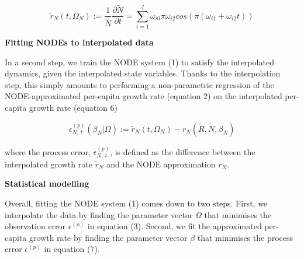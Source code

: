 \documentclass[11pt, oneside]{article}
\begin{document}
\vspace{-0.5cm}
\begin{equation}
    \tilde{r}_N (t,\Omega_N) := \frac{1}{\tilde{N}} \frac{\partial \tilde{N}}{\partial t} = \sum_{i=1}^{I} \omega_{i0} \pi \omega_{i2} cos \left(\pi (\omega_{i1} + \omega_{i2} t) \right)
\end{equation}


\textbf{Fitting NODEs to interpolated data}

In a second step, we train the NODE system (1) to satisfy the interpolated dynamics, given the interpolated state variables.
Thanks to the interpolation step, this simply amounts to performing a non-parametric regression of the NODE-approximated per-capita growth rate (equation 2) on the interpolated per-capita growth rate (equation 6)

\vspace{-0.5cm}
\begin{equation}
    \epsilon^{(p)}_{N,~t}(\beta_N | \Omega) := \tilde{r}_N (t,\Omega_N) - r_N \left( \tilde{R},\tilde{N},\beta_N \right)
\end{equation}

where the process error, $\epsilon^{(p)}_{N,~t}$, is defined as the difference between the interpolated growth rate $\tilde{r}_N$ and the NODE approximation $r_N$. 

\textbf{Statistical modelling}

Overall, fitting the NODE system (1) comes down to two steps. 
First, we interpolate the data by finding the parameter vector $\Omega$ that minimises the observation error $\epsilon^{(o)}$ in equation (3).
Second, we fit the approximated per-capita growth rate by finding the parameter vector $\beta$ that minimises the process error $\epsilon^{(p)}$ in equation (7).
\end{document}
